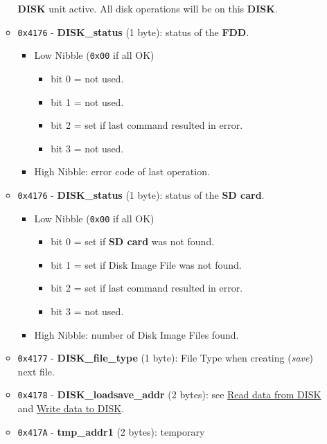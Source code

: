 \documentclass[a4paper,11pt]{article}
\begin{document}
\begin{itemize}
\begin{itemize}
            \textbf{DISK} unit active. All disk operations will be on this
            \textbf{DISK}.
            \item \texttt{0x4176} - \textbf{DISK\_status} (1 byte): status of
            the \textbf{FDD}.
            \begin{itemize}
                \item Low Nibble (\texttt{0x00} if all OK)
                \begin{itemize}
                    \item bit 0 = not used.
                    \item bit 1 = not used.
                    \item bit 2 = set if last command resulted in error.
                    \item bit 3 = not used.
                \end{itemize}
                \item High Nibble: error code of last operation.
            \end{itemize}
            \item \texttt{0x4176} - \textbf{DISK\_status} (1 byte): status of
            the \textbf{SD card}.
            \begin{itemize}
                \item Low Nibble (\texttt{0x00} if all OK)
                \begin{itemize}
                    \item bit 0 = set if \textbf{SD card} was not found.
                    \item bit 1 = set if Disk Image File was not found.
                    \item bit 2 = set if last command resulted in error.
                    \item bit 3 = not used.
                \end{itemize}
                \item High Nibble: number of Disk Image Files found.
            \end{itemize}
            \item \texttt{0x4177} - \textbf{DISK\_file\_type} (1 byte): File
            Type when creating (\textit{save}) next file.
            \item \texttt{0x4178} - \textbf{DISK\_loadsave\_addr} (2 bytes): see
            \hyperref[sec:howto_readdata]{Read data from DISK} and 
            \hyperref[sec:howto_writedata]{Write data to DISK}.
            \item \texttt{0x417A} - \textbf{tmp\_addr1} (2 bytes): temporary

\end{itemize}
\end{itemize}
\end{document}
